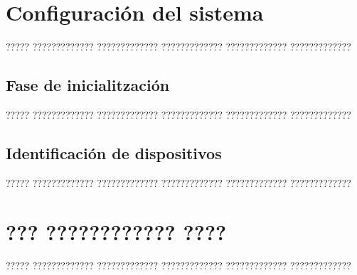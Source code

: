 \documentclass[11pt,spanish,listoffigures,listoftables]{tfgetsinf}
\begin{document}

\APPENDIX


\chapter{Configuración del sistema}

????? ????????????? ????????????? ????????????? ????????????? ?????????????

\section{Fase de inicialitzación}

????? ????????????? ????????????? ????????????? ????????????? ?????????????

\section{Identificación de dispositivos}

????? ????????????? ????????????? ????????????? ????????????? ?????????????



\chapter{??? ???????????? ????}

????? ????????????? ????????????? ????????????? ????????????? ????????????? 



\end{document}
